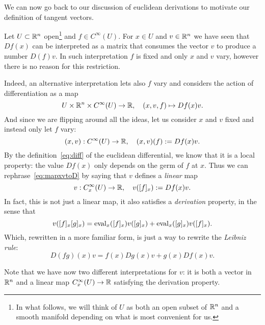We can now go back to our discussion of euclidean derivations to motivate our definition of tangent vectors.

\begin{example}\label{ex:euclideanD}
  Let $U\subset\mathbb{R}^n$ open\footnote{In what follows, we will think of $U$ as both an open subset of $\mathbb{R}^n$ and a smooth manifold depending on what is most convenient for us.} and $f\in C^\infty(U)$.
  For $x\in U$ and $v\in\mathbb{R}^n$ we have seen that $Df(x)$ can be interpreted as a matrix that consumes the vector $v$ to produce a number $D(f)v$.
  In such interpretation $f$ is fixed and only $x$ and $v$ vary, however there is no reason for this restriction.

  Indeed, an alternative interpretation lets also $f$ vary and considers the action of differentiation as a map
  \begin{equation}
    U \times \mathbb{R}^n \times C^\infty(U) \to \mathbb{R},\quad
    (x,v,f) \mapsto Df(x) v.
  \end{equation}
  And since we are flipping around all the ideas, let us consider $x$ and $v$ fixed and instead only let $f$ vary:
  \begin{equation}\label{eq:mapxvtoD}
    (x,v):C^\infty(U) \to\mathbb{R}, \quad (x,v)(f) := Df(x)v.
  \end{equation}
  By the definition~\eqref{eq:diff} of the euclidean differential, we know that it is a local property: the value $Df(x)$ only depends on the germ of $f$ at $x$.
  Thus we can rephrase~\eqref{eq:mapxvtoD} by saying that $v$ defines a \emph{linear} map
  \begin{equation}
    v : C_x^\infty(U) \to \mathbb{R}, \quad
    v([f]_x) := Df(x) v.
  \end{equation}
  In fact, this is not just a linear map, it also satisfies a \emph{derivation} property, in the sense that
  \begin{equation}
    v([f]_x [g]_x) =
      \operatorname{eval}_x([f]_x)v([g]_x)
      + \operatorname{eval}_x([g]_x)v([f]_x).
  \end{equation}
  Which, rewritten in a more familiar form, is just a way to rewrite the \emph{Leibniz rule}:
  \begin{equation}
    D(fg)(x) v = f(x)Dg(x)v + g(x) Df(x)v.
  \end{equation}

  Note that we have now two different interpretations for $v$: it is both a vector in $\mathbb{R}^n$ and a linear map $C_x^\infty(U) \to \mathbb{R}$ satisfying the derivation property.
\end{example}

